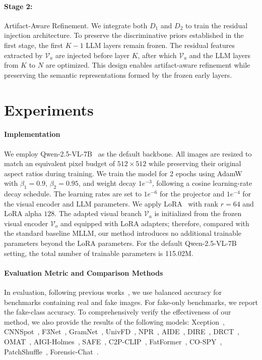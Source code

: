 \documentclass{article}
\theoremstyle{plain}
\theoremstyle{definition}
\theoremstyle{remark}
\begin{document}
\paragraph{Stage 2:} Artifact-Aware Refinement. We integrate both $D_1$ and $D_2$ to train the residual injection architecture. To preserve the discriminative priors established in the first stage, the first $K-1$ LLM layers remain frozen. The residual features extracted by $\mathcal{V}_a$ are injected before layer $K$, after which $\mathcal{V}_a$ and the LLM layers from $K$ to $N$ are optimized. This design enables artifact-aware refinement while preserving the semantic representations formed by the frozen early layers.

\section{Experiments}

\paragraph{Implementation}
We employ Qwen-2.5-VL-7B~\cite{qwen25} as the default backbone. 
All images are resized to match an equivalent pixel budget of $512 \times 512$ while preserving their original aspect ratios during training. 
We train the model for 2 epochs using AdamW with $\beta_1=0.9$, $\beta_2=0.95$, and weight decay $1e^{-3}$, following a cosine learning-rate decay schedule. 
The learning rates are set to $1e^{-6}$ for the projector and $1e^{-4}$ for the visual encoder and LLM parameters. 
We apply LoRA~\citep{hu2022lora} with rank $r=64$ and LoRA alpha $128$. 
The adapted visual branch $\mathcal{V}_a$ is initialized from the frozen visual encoder $\mathcal{V}_o$ and equipped with LoRA adapters; therefore, compared with the standard baseline MLLM, our method introduces no additional trainable parameters beyond the LoRA parameters. 
For the default Qwen-2.5-VL-7B setting, the total number of trainable parameters is 115.02M.

\paragraph{Evaluation Metric and Comparison Methods}
In evaluation, following previous works~\cite{yan2025orthogonal,chen2025dual}, we use balanced accuracy for benchmarks containing real and fake images. For fake-only benchmarks, we report the fake-class accuracy.
To comprehensively verify the effectiveness of our method, we also provide the results of the following models:
Xception~\citep{chollet2017xception}, CNNSpot~\citep{wang2020cnn}, F3Net~\citep{qian2020thinking}, GramNet~\citep{liu2020global}, UnivFD~\citep{ojha2023towards}, NPR~\citep{tan2024rethinking}, AIDE~\citep{yan2025a}, DIRE~\citep{wang2023dire}, DRCT~\citep{chen2024drct}, OMAT~\citep{zhou2025breaking}, AIGI-Holmes~\citep{zhou2025aigi}, SAFE~\citep{li2025improving}, C2P-CLIP~\citep{tan2025c2p}, FatFormer~\citep{liu2024forgery}, CO-SPY~\citep{cheng2025co}, PatchShuffle~\citep{zheng2024breaking}, Forensic-Chat~\citep{lin2025seeing}.
\end{document}
